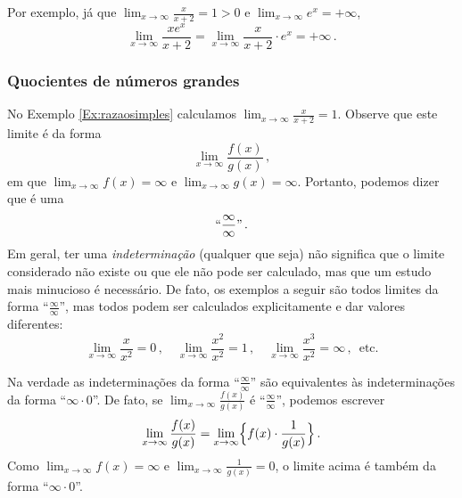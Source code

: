 \begin{ex}
Por exemplo, 
já que $\lim_{x\to\infty}\frac{x}{x+2}=1>0$ e $\lim_{x\to\infty}e^x=+\infty$, 
\[ 
\lim_{x\to\infty}\frac{xe^x}{x+2}=
\lim_{x\to\infty}\frac{x}{x+2}\cdot e^x=+\infty\,.
\]
\end{ex}

\subsubsection{Quocientes de números grandes}

No Exemplo \ref{Ex:razaosimples} calculamos 
$\lim_{x\to \infty}\frac{x}{x+2}=1$. Observe que 
este limite é da forma
\[ 
\lim_{x\to \infty}\frac{f(x)}{g(x)}\,,
\]
em que $\lim_{x\to\infty}f(x)=\infty$ e 
$\lim_{x\to\infty}g(x)=\infty$.
Portanto, podemos dizer que é uma 
\[ ``\frac{\infty}{\infty}"\,.
\]
Em geral, ter uma \emph{indeterminação} (qualquer que seja) não significa
que o limite considerado não existe ou que ele não pode ser calculado, mas
que um estudo mais minucioso é necessário.
De fato, os exemplos a seguir 
são todos limites da forma ``$\frac{\infty}{\infty}$'',
mas todos podem ser calculados explicitamente e dar valores
diferentes:
\[ 
\lim_{x\to\infty}\frac{x}{x^2}=0\,,\quad
\lim_{x\to\infty}\frac{x^2}{x^2}=1\,,\quad
\lim_{x\to\infty}\frac{x^3}{x^2}=\infty\,,\,\text{ etc.}
\]
\begin{obs}
Na verdade as indeterminações da forma ``$\frac{\infty}{\infty}$'' são
equivalentes às indeterminações da forma ``$\infty\cdot 0$''. De fato, se 
$\lim_{x\to \infty}\frac{f(x)}{g(x)}$ é
``$\frac{\infty}{\infty}$'', podemos escrever \[ 
\lim_{x\to \infty}\frac{f(x)}{g(x)}=
\lim_{x\to \infty}\Bigl\{f(x)\cdot \frac{1}{g(x)}\Bigr\}\,.
\]
Como 
$\lim_{x\to\infty}f(x)=\infty$ e 
$\lim_{x\to\infty}\frac{1}{g(x)}=0$, o limite acima é também da forma
``$\infty\cdot 0$''.
\end{obs}

